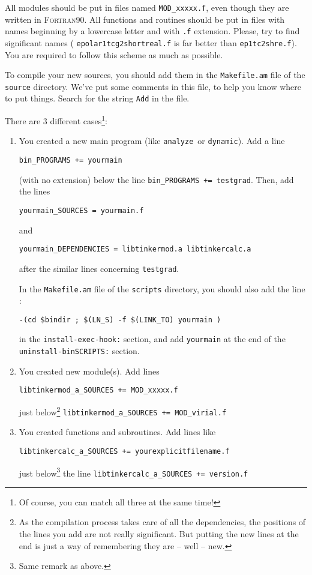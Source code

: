 \documentclass[peerreview]{IEEEtran}
\def\analyze{\texttt{analyze}}
\def\dynamic{\texttt{dynamic}}
\def\testgrad{\texttt{testgrad}}
\begin{document}
All modules should be put in files named \texttt{MOD\_xxxxx.f}, even though they are written in \textsc{Fortran90}. All functions and routines should be put in files with names beginning by a lowercase letter and with \texttt{.f} extension. Please, try to find significant names ( \texttt{epolar1tcg2shortreal.f} is far better than \texttt{ep1tc2shre.f}). You are required to follow this scheme as much as possible.

To compile your new sources, you should add them in the \texttt{Makefile.am} file of the \texttt{source} directory. We've put some comments in this file, to help you know where to put things. Search for the string \texttt{Add} in the file. 

There are 3 different cases\footnote{Of course, you can match all three at the same time!}:

\begin{enumerate}
    \item You created a new main program (like \analyze\ or \dynamic). Add a line
    
    \hskip1.5cm \texttt{bin\_PROGRAMS += yourmain}
    
    (with no extension) below the line \texttt{bin\_PROGRAMS += testgrad}. Then, add the lines
    
    \hskip1.5cm \texttt{yourmain\_SOURCES = yourmain.f}
    
    and
    
    \hskip1.5cm \texttt{yourmain\_DEPENDENCIES = libtinkermod.a libtinkercalc.a }
    
    after the similar lines concerning \testgrad.
    
    In the \texttt{Makefile.am} file of the \texttt{scripts} directory, you should also add the line :
    
   \hskip1.5cm \texttt{-(cd \${bindir} ; \$(LN\_S) -f \$(LINK\_TO) yourmain )}
        
    in the \texttt{install-exec-hook:} section, and add \texttt{yourmain} at the end of the \texttt{uninstall-binSCRIPTS:} section.
    \item You created new module(s). Add lines 
    
    \hskip1.5cm \texttt{libtinkermod\_a\_SOURCES += MOD\_xxxxx.f}
    
    just below\footnote{As the compilation process takes care of all the dependencies, the positions of the lines you add are not really significant. But putting the new lines at the end is just a way of remembering they are -- well -- new.} \texttt{libtinkermod\_a\_SOURCES += MOD\_virial.f}
    \item You created functions and subroutines. Add lines like
    
    \hskip1.5cm \texttt{libtinkercalc\_a\_SOURCES += yourexplicitfilename.f}
    
    just below\footnote{Same remark as above.} the line \texttt{libtinkercalc\_a\_SOURCES += version.f}
\end{enumerate}
\end{document}

